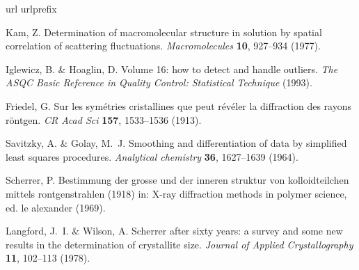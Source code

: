 \documentclass [12pt,fleqn]{article}
\begin{document}
\begin{thebibliography}{10}
\expandafter\ifx\csname url\endcsname\relax
  \def\url#1{\texttt{#1}}\fi
\expandafter\ifx\csname urlprefix\endcsname\relax\def\urlprefix{URL }\fi
\providecommand{\bibinfo}[2]{#2}
\providecommand{\eprint}[2][]{\url{#2}}

\bibinfo{author}{Kam, Z.}
\newblock \bibinfo{title}{Determination of macromolecular structure in solution
  by spatial correlation of scattering fluctuations}.
\newblock \emph{\bibinfo{journal}{Macromolecules}}
  \textbf{\bibinfo{volume}{10}}, \bibinfo{pages}{927--934}
  (\bibinfo{year}{1977}).

\bibinfo{author}{Iglewicz, B.} \& \bibinfo{author}{Hoaglin, D.}
\newblock \bibinfo{title}{Volume 16: how to detect and handle outliers}.
\newblock \emph{\bibinfo{journal}{The ASQC Basic Reference in Quality Control:
  Statistical Technique}}  (\bibinfo{year}{1993}).

\bibinfo{author}{Friedel, G.}
\newblock \bibinfo{title}{Sur les sym{\'e}tries cristallines que peut
  r{\'e}v{\'e}ler la diffraction des rayons r{\"o}ntgen}.
\newblock \emph{\bibinfo{journal}{CR Acad Sci}} \textbf{\bibinfo{volume}{157}},
  \bibinfo{pages}{1533--1536} (\bibinfo{year}{1913}).

\bibinfo{author}{Savitzky, A.} \& \bibinfo{author}{Golay, M.~J.}
\newblock \bibinfo{title}{Smoothing and differentiation of data by simplified
  least squares procedures.}
\newblock \emph{\bibinfo{journal}{Analytical chemistry}}
  \textbf{\bibinfo{volume}{36}}, \bibinfo{pages}{1627--1639}
  (\bibinfo{year}{1964}).

\bibinfo{author}{Scherrer, P.}
\newblock \bibinfo{title}{Bestimmung der grosse und der inneren struktur von
  kolloidteilchen mittels rontgenstrahlen (1918) in: X-ray diffraction methods
  in polymer science, ed. le alexander} (\bibinfo{year}{1969}).

\bibinfo{author}{Langford, J.~I.} \& \bibinfo{author}{Wilson, A.}
\newblock \bibinfo{title}{Scherrer after sixty years: a survey and some new
  results in the determination of crystallite size}.
\newblock \emph{\bibinfo{journal}{Journal of Applied Crystallography}}
  \textbf{\bibinfo{volume}{11}}, \bibinfo{pages}{102--113}
  (\bibinfo{year}{1978}).
\end{thebibliography}
\end{document}
